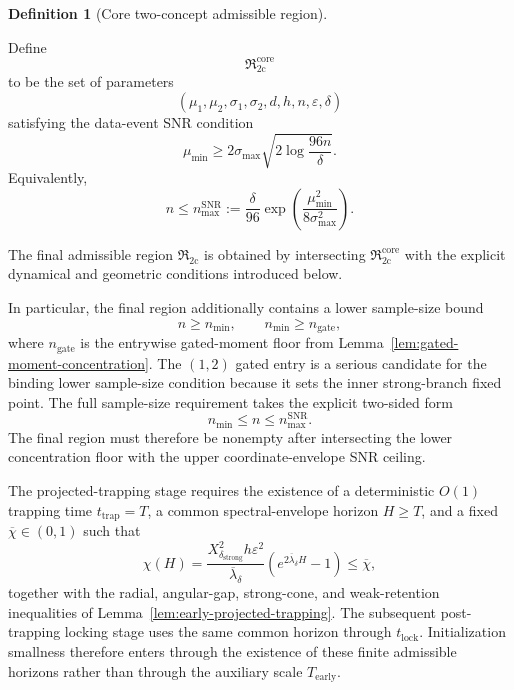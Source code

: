 \documentclass{article} %
\theoremstyle{plain}
\theoremstyle{definition}
\newtheorem{definition}[theorem]{Definition}
\theoremstyle{remark}
\begin{document}

\begin{definition}[Core two-concept admissible region]
\label{def:R2c-core}

Define
\[
\mathfrak R_{\mathrm{2c}}^{\mathrm{core}}
\]
to be the set of parameters
\[
\boxed{
(\mu_1,\mu_2,\sigma_1,\sigma_2,d,h,n,\varepsilon,\delta)
}
\]
satisfying the data-event SNR condition
\[
\boxed{
\mu_{\min}
\ge
2\sigma_{\max}
\sqrt{2\log\frac{96n}{\delta}}.
}
\]
Equivalently,
\[
\boxed{
n
\le
n_{\max}^{\mathrm{SNR}}
:=
\frac{\delta}{96}
\exp\left(\frac{\mu_{\min}^2}{8\sigma_{\max}^2}\right).
}
\]
\end{definition}

The final admissible region $\mathfrak R_{\mathrm{2c}}$ is obtained by
intersecting $\mathfrak R_{\mathrm{2c}}^{\mathrm{core}}$ with the explicit
dynamical and geometric conditions introduced below.

In particular, the final region additionally contains a lower sample-size
bound
\[
n\ge n_{\min},
\qquad
n_{\min}\ge n_{\mathrm{gate}},
\]
where $n_{\mathrm{gate}}$ is the entrywise gated-moment floor from
Lemma~\ref{lem:gated-moment-concentration}.  The $(1,2)$ gated entry is a
serious candidate for the binding lower sample-size condition because it
sets the inner strong-branch fixed point.  The full sample-size requirement
takes the explicit two-sided form
\[
\boxed{
n_{\min}\le n\le n_{\max}^{\mathrm{SNR}}.
}
\]
The final region must therefore be nonempty after intersecting the lower
concentration floor with the upper coordinate-envelope SNR ceiling.

The projected-trapping stage requires the existence of a deterministic
$O(1)$ trapping time $t_{\mathrm{trap}}=T$, a common spectral-envelope
horizon $H\ge T$, and a fixed $\overline\chi\in(0,1)$ such that
\[
\boxed{
\chi(H)
=
\frac{X_{\delta_{\mathrm{strong}}}^2h\varepsilon^2}
{\overline\lambda_\delta}
\left(e^{2\overline\lambda_\delta H}-1\right)
\le
\overline\chi,
}
\]
together with the radial, angular-gap, strong-cone, and weak-retention
inequalities of Lemma~\ref{lem:early-projected-trapping}.  The subsequent
post-trapping locking stage uses the same common horizon through
$t_{\mathrm{lock}}$.  Initialization smallness therefore enters through the
existence of these finite admissible horizons rather than through the
auxiliary scale $T_{\mathrm{early}}$.
\end{document}
